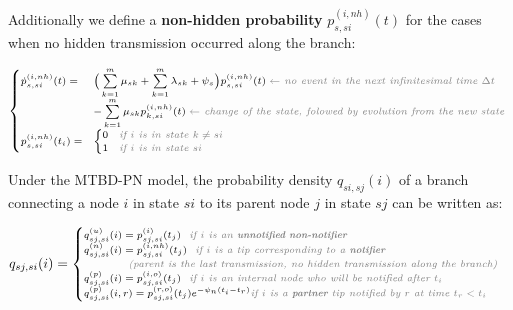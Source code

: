 \documentclass[a4paper,10pt]{article}
\begin{document}
Additionally we define a \textbf{non-hidden probability} $p^{(i,nh)}_{s,si}(t)$ for the cases when no hidden transmission occurred along the branch:

\begin{equation}
\scriptsize
\begin{cases}
\dot{p}_{s,si}^{(i,nh)}(t) = & \Big(\sum\limits_{k=1}^{m} \mu_{sk} + \sum\limits_{k=1}^{m} \lambda_{sk} + \psi_s\Big) p_{s,si}^{(i,nh)}(t)\; \textit{\color{gray} $\leftarrow$ no event in the next infinitesimal time $\Delta t$ }\\
    & - \sum\limits_{k=1}^{m} \mu_{sk} p_{k,si}^{(i,nh)}(t)\;  \textit{\color{gray} $\leftarrow$ change of the state, folowed by evolution from the new state }\\
p_{s,si}^{(i,nh)}(t_i) = & 
    \begin{cases}
    0 & \textit{\color{gray} if $i$ is in state $k \neq si$}\\
    1 & \textit{\color{gray} if $i$ is in state $si$}
    \end{cases}\label{eq:p-nh}
\end{cases}
\end{equation}

Under the MTBD-PN model, the probability density $q_{si,sj}(i)$ of a branch connecting a node $i$ in state $si$ to its parent node $j$ in state $sj$ can be written as:


\begin{equation}
\scriptsize
q_{sj,si}(i) = 
\begin{cases}
q^{(u)}_{sj,si}(i) = p^{(i)}_{sj,si}(t_j) \textit{\color{gray} ~~if $i$ is an \textbf{unnotified non-notifier}}\\
q_{sj,si}^{(n)}(i) = 
p_{sj,si}^{(i,nh)}(t_j) \textit{\color{gray} ~~if $i$ is a tip corresponding to a \textbf{notifier}}\\
~~~~~~~~~~~~ \textit{\color{gray}(parent is the last transmission, no hidden transmission along the branch)}
\\
q^{(p)}_{sj,si}(i)  = p^{(i, o)}_{sj,si}(t_j)  \textit{\color{gray} ~~if $i$ is an internal node who will be notified after $t_i$}
\\
q^{(p)}_{sj,si}(i, r)  = p^{(r, o)}_{sj,si}(t_j) e^{- \psi_n (t_i - t_r)} \textit{\color{gray} if $i$ is a \textbf{partner} tip notified by $r$ at time $t_r < t_i$}\\
\end{cases}
\label{eq:branch}
\end{equation}
\end{document}
